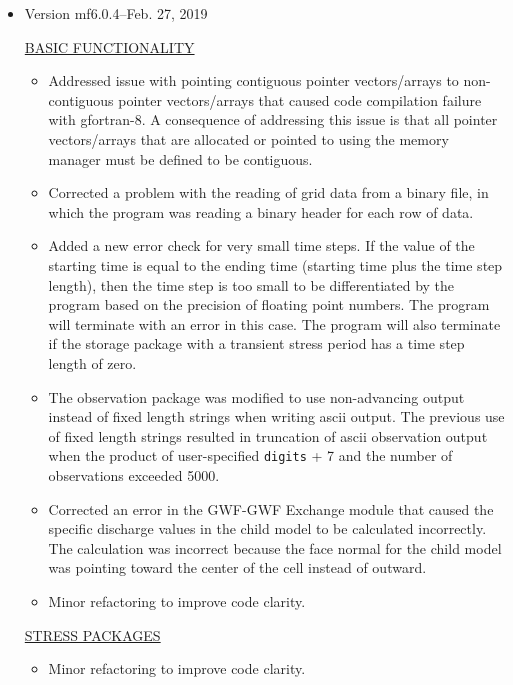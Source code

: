 \documentclass[11pt,twoside,twocolumn]{usgsreport}
\begin{document}
\begin{itemize}
\item Version mf6.0.4--Feb. 27, 2019

\underline{BASIC FUNCTIONALITY}
\begin{itemize}
\item Addressed issue with pointing contiguous pointer vectors/arrays to non-contiguous pointer vectors/arrays that caused code compilation failure with gfortran-8. A consequence of addressing this issue is that all pointer vectors/arrays that are allocated or pointed to using the memory manager must be defined to be contiguous.
\item Corrected a problem with the reading of grid data from a binary file, in which the program was reading a binary header for each row of data.
\item Added a new error check for very small time steps.  If the value of the starting time is equal to the ending time (starting time plus the time step length), then the time step is too small to be differentiated by the program based on the precision of floating point numbers.  The program will terminate with an error in this case.  The program will also terminate if the storage package with a transient stress period has a time step length of zero.
\item The observation package was modified to use non-advancing output instead of fixed length strings when writing ascii output. The previous use of fixed length strings resulted in truncation of ascii observation output when the product of user-specified \texttt{digits} + 7 and the number of observations exceeded 5000.
\item Corrected an error in the GWF-GWF Exchange module that caused the specific discharge values in the child model to be calculated incorrectly.  The calculation was incorrect because the face normal for the child model was pointing toward the center of the cell instead of outward.
\item Minor refactoring to improve code clarity.
\end{itemize}

\underline{STRESS PACKAGES}
\begin{itemize}
\item Minor refactoring to improve code clarity.
\end{itemize}


\end{itemize}
\end{document}
